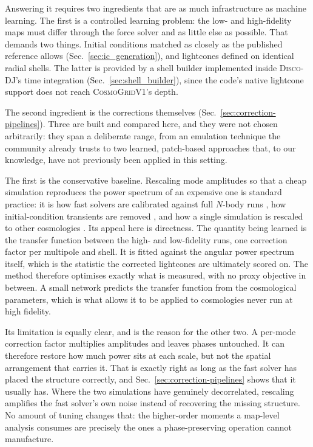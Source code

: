 \documentclass{report}
\begin{document}
Answering it requires two ingredients that are as much infrastructure as machine learning. The first is a controlled learning problem: the low- and high-fidelity maps must differ through the force solver and as little else as possible. That demands two things. Initial conditions matched as closely as the published reference allows (Sec.~\ref{sec:ic_generation}), and lightcones defined on identical radial shells. The latter is provided by a shell builder implemented inside \textsc{Disco-DJ}'s time integration (Sec.~\ref{sec:shell_builder}), since the code's native lightcone support does not reach \textsc{CosmoGridV1}'s depth.

The second ingredient is the corrections themselves (Sec.~\ref{sec:correction-pipelines}). Three are built and compared here, and they were not chosen arbitrarily: they span a deliberate range, from an emulation technique the community already trusts to two learned, patch-based approaches that, to our knowledge, have not previously been applied in this setting.

The first is the conservative baseline. Rescaling mode amplitudes so that a cheap simulation reproduces the power spectrum of an expensive one is standard practice: it is how fast solvers are calibrated against full \mbox{$N$}-body runs \cite{feng_fastpm_2016}, how initial-condition transients are removed \cite{garrison_improving_2016}, and how a single simulation is rescaled to other cosmologies \cite{angulo_one_2009}. Its appeal here is directness. The quantity being learned is the transfer function between the high- and low-fidelity runs, one correction factor per multipole and shell. It is fitted against the angular power spectrum itself, which is the statistic the corrected lightcones are ultimately scored on. The method therefore optimises exactly what is measured, with no proxy objective in between. A small network predicts the transfer function from the cosmological parameters, which is what allows it to be applied to cosmologies never run at high fidelity.

Its limitation is equally clear, and is the reason for the other two. A per-mode correction factor multiplies amplitudes and leaves phases untouched. It can therefore restore how much power sits at each scale, but not the spatial arrangement that carries it. That is exactly right as long as the fast solver has placed the structure correctly, and Sec.~\ref{sec:correction-pipelines} shows that it usually has. Where the two simulations have genuinely decorrelated, rescaling amplifies the fast solver's own noise instead of recovering the missing structure. No amount of tuning changes that: the higher-order moments a map-level analysis consumes are precisely the ones a phase-preserving operation cannot manufacture.
\end{document}
